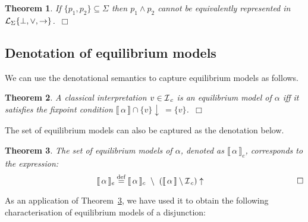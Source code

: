 \documentclass{tlp}
\newcommand{\eqdef}{\mathbin{\stackrel{\mathrm{def}}{=}}}
\def\cIc{{\cal I}_{\, c}}
\def\down{\downarrow}
\def\up{\uparrow}
\def\L{{\cal L}}
\newcommand{\den}[1]{\llbracket \, #1 \, \rrbracket}
\def\qed{~\hfill$\Box$}
\newtheorem{theorem}{Theorem}
\begin{document}
\begin{theorem}\label{th:wedge} 
If $\{p_1,p_2\}\subseteq \Sigma$ then $p_1 \wedge p_2$ cannot be equivalently represented in $\L_{\Sigma}\{\bot, \vee, \rightarrow\}$.\qed
\end{theorem}

\subsection{Denotation of equilibrium models}

We can use the denotational semantics to capture equilibrium models as follows.
\begin{theorem}\label{th:1eq} 
A classical interpretation $v \in \cIc$ is an equilibrium model of $\alpha$ iff it  satisfies the fixpoint condition $\den{\alpha} \cap \{v\}\down \ = \{v\}$.\qed
\end{theorem}

The set of equilibrium models can also be captured as the denotation below.
\begin{theorem}\label{th:eq} 
The set of equilibrium models of $\alpha$, denoted as $\den{\alpha}_e$, corresponds to the expression:
\[
\hspace{110pt}
 \den{\alpha}_e \eqdef \den{\alpha}_c \ \setminus \ (\den{\alpha} \setminus \cIc ) \up \hspace{110pt} \Box
\]
\end{theorem}

As an application of Theorem~\ref{th:eq}, we have used it to obtain the following characterisation of equilibrium models of a disjunction:
\end{document}
